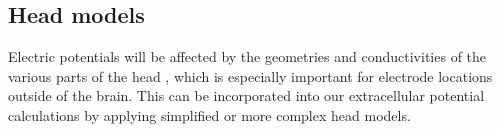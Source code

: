 \documentclass[preprint,10pt,authoryear]{elsarticle}
\begin{document}
%
%
%
%
%
%
%
%
%


\subsection{Head models}
Electric potentials will be affected by the geometries and conductivities of the various parts of the head \citep{NUNEZ2006}, which is especially important for electrode locations outside of the brain. This can be incorporated into our extracellular potential calculations by applying simplified or more complex head models.
\end{document}
